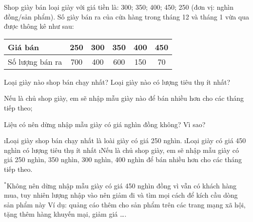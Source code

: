 \begin{bt}
	Shop giày bán loại giày với giá tiền là: 300; 350; 400; 450; 250  (đơn vị: nghìn đồng/sản phẩm). Số giày bán ra của cửa hàng trong tháng 12 và tháng 1 vừa qua được thông kê như sau:
	\begin{center}
		\begin{tabular}{|l|c|c|c|c|c|}
			\hline
			Giá bán	&250&	300&	350&	400&	450\\
			\hline
			Số lượng bán ra&	700&	400&	600&	150&	70\\
			\hline
		\end{tabular}
	\end{center}
	Loại giày nào shop bán chạy nhất? Loại giày nào có lượng tiêu thụ ít nhất?
	
	Nếu là chủ shop giày, em sẽ nhập mẫu giày nào để bán nhiều hơn cho các tháng tiếp theo;
	
	Liệu có nên dừng nhập mẫu giày có giá  nghìn đồng không? Vì sao?
	\begin{loigiaichuong39}
		\begin{enumerate}[--,leftmargin=*]
			\i Loại giày shop bán chạy nhất là loài giày có giá 250 nghìn.
			\i Loại giày có giá 450 nghìn có lượng tiêu thụ ít nhất
			\i Nếu là chủ shop giày, em sẽ nhập mẫu giày có giá 250 nghìn, 350 nghìn, 300  nghìn,  400 nghìn để bán nhiều hơn cho các tháng tiếp theo.
		\end{enumerate}
		$^*$Không nên dừng nhập mẫu giày có giá 450 nghìn đồng vì vẫn có khách hàng mua, tuy nhiên lượng nhập vào nên giảm đi và tìm mọi cách để kích cầu dòng sản phẩm này 
		Ví dụ: quảng cáo thêm cho sản phẩm trên các trang mạng xã hội, tặng thêm hàng khuyến mại, giảm giá \ldots.
	\end{loigiaichuong39}
\end{bt}
